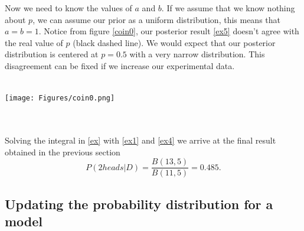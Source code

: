 \documentclass[onecolumn,           %
               showpacs,            %
               preprintnumbers,     %
               aps,                 %
               letterpaper,             %
               superscriptaddress,      %
               nofootinbib,         %
               tightenlines,        %
               floats,floatfix      %
               ,usenatbib,
               ]{revtex4-1}
\begin{document}
Now we need to know the values of $a$ and $b$. If we assume that we know nothing about $p$, we can assume our prior as a uniform distribution, this means that $a=b=1$. 
Notice from figure \ref{coin0}, our posterior result \eqref{ex5} doesn't agree with the real value of $p$ (black dashed line). We would expect that our posterior distribution is centered at $p=0.5$ with a very narrow distribution. This disagreement can be fixed if we increase our experimental data.\\ $ $\\
\begin{minipage}{\textwidth}
\centering
\texttt{[image: Figures/coin0.png]}
\label{coin0}
\end{minipage}
\\$ $ \\
Solving the integral in \eqref{ex} with \eqref{ex1} and \eqref{ex4} we arrive at the final result obtained in the previous section
\begin{equation}
P(2heads|D)=\frac{B(13,5)}{B(11,5)}=0.485.
\end{equation}
%
%
%
\subsection{Updating the probability distribution for a model} 
\end{document}
